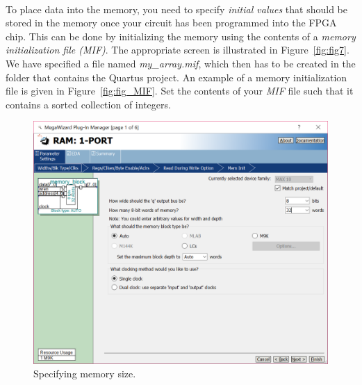 \documentclass[epsfig,10pt,fullpage]{article}
\begin{document}
~\\
To place data into the memory, you need to specify {\it initial values}
that should be stored in the memory once your circuit has been programmed into the FPGA chip.
This can be done by initializing the memory using the contents of a {\it memory initialization 
file (MIF)}. The appropriate screen is illustrated in Figure~\ref{fig:fig7}. We have specified 
a file named {\it my\_array.mif}, which then has to be created in the folder that 
contains the Quartus project. An example of a memory initialization file is given in 
Figure~\ref{fig:fig_MIF}.  Set the contents of your {\it MIF} file such that it contains a
sorted collection of integers.

\begin{figure}[H]
	\begin{center}
		\includegraphics[scale=0.4]{figures/figure5.png}
	\end{center}
	\caption{{Specifying memory size.}}
	\label{fig:fig5}
\end{figure}
\end{document}
